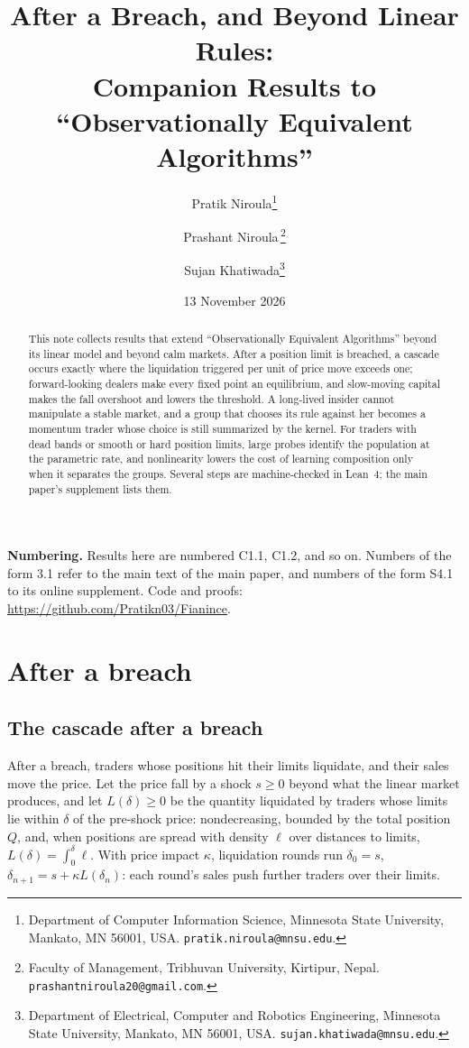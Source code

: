 \documentclass[12pt]{article}
\title{After a Breach, and Beyond Linear Rules:\\ Companion Results to\\ ``Observationally Equivalent Algorithms''}
\author{Pratik Niroula\thanks{Department of Computer Information Science, Minnesota State University, Mankato, MN 56001, USA. \texttt{pratik.niroula@mnsu.edu}.}
\and Prashant Niroula\,\thanks{Faculty of Management, Tribhuvan University, Kirtipur, Nepal. \texttt{prashantniroula20@gmail.com}.}
\and Sujan Khatiwada\thanks{Department of Electrical, Computer and Robotics Engineering, Minnesota State University, Mankato, MN 56001, USA. \texttt{sujan.khatiwada@mnsu.edu}.}}
\date{13 November 2026}
\theoremstyle{definition}
\theoremstyle{remark}
\begin{document}
\maketitle
\begin{abstract}
\noindent This note collects results that extend ``Observationally Equivalent Algorithms'' \citep{niroula2026m} beyond its linear model and beyond calm markets. After a position limit is breached, a cascade occurs exactly where the liquidation triggered per unit of price move exceeds one; forward-looking dealers make every fixed point an equilibrium, and slow-moving capital makes the fall overshoot and lowers the threshold. A long-lived insider cannot manipulate a stable market, and a group that chooses its rule against her becomes a momentum trader whose choice is still summarized by the kernel. For traders with dead bands or smooth or hard position limits, large probes identify the population at the parametric rate, and nonlinearity lowers the cost of learning composition only when it separates the groups. Several steps are machine-checked in Lean~4; the main paper's supplement lists them.
\end{abstract}

\noindent\textbf{Numbering.} Results here are numbered C1.1, C1.2, and so on. Numbers of the form 3.1 refer to the main text of the main paper, and numbers of the form S4.1 to its online supplement. Code and proofs: \url{https://github.com/Pratikn03/Fianince}.

\renewcommand{\thesection}{C\arabic{section}}
\section{After a breach}

\subsection{The cascade after a breach}

After a breach, traders whose positions hit their limits liquidate, and their sales move the price. Let the price fall by a shock $s\ge0$ beyond what the linear market produces, and let $L(\delta)\ge0$ be the quantity liquidated by traders whose limits lie within $\delta$ of the pre-shock price: nondecreasing, bounded by the total position $Q$, and, when positions are spread with density $\ell$ over distances to limits, $L(\delta)=\int_0^\delta\ell$. With price impact $\kappa$, liquidation rounds run $\delta_0=s$, $\delta_{n+1}=s+\kappa L(\delta_n)$: each round's sales push further traders over their limits.
\end{document}
